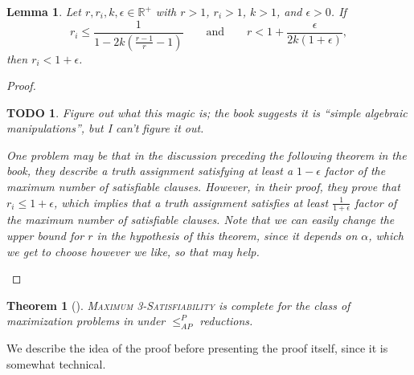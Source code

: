 \documentclass[]{article}
\theoremstyle{plain}
\newtheorem{theorem}{Theorem}
\newtheorem{lemma}{Lemma}
\newtheorem{todo}{TODO}
\theoremstyle{definition}
\newcommand{\APr}{\leq_{AP}^{P}}
\begin{document}
\begin{lemma}\label{lem:magic}
  Let $r, r_i, k, \epsilon \in \mathbb{R}^+$ with $r > 1$, $r_i > 1$, $k > 1$, and $\epsilon > 0$.
  If
  \begin{equation*}
    r_i \leq \frac{1}{1 - 2k(\frac{r - 1}{r} - 1)} \qquad \text{and} \qquad r < 1 + \frac{\epsilon}{2k(1 + \epsilon)},
  \end{equation*}
  then $r_i < 1 + \epsilon$.
\end{lemma}
\begin{proof}
  \begin{todo}
    Figure out what this magic is; the book suggests it is ``simple algebraic manipulations'', but I can't figure it out.

    One problem may be that in the discussion preceding the following theorem in the book, they describe a truth assignment satisfying at least a $1 - \epsilon$ factor of the maximum number of satisfiable clauses.
    However, in their proof, they prove that $r_i \leq 1 + \epsilon$, which implies that a truth assignment satisfies at least $\frac{1}{1 + \epsilon}$ factor of the maximum number of satisfiable clauses.
    Note that we can easily change the upper bound for $r$ in the hypothesis of this theorem, since it depends on $\alpha$, which we get to choose however we like, so that may help.
  \end{todo}
\end{proof}

\begin{theorem}[{\cite[Theorem~8.6]{book}}]\label{thm:maxcomplete}
  \textsc{Maximum 3-Satisfiability} is complete for the class of maximization problems in \APX{} under $\APr$ reductions.
\end{theorem}

We describe the idea of the proof before presenting the proof itself, since it is somewhat technical.
\end{document}
